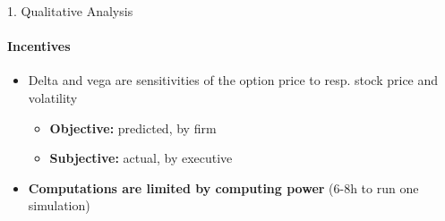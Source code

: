 \documentclass[compress]{beamer}
\begin{document}

\begin{frame}{1. Qualitative Analysis}
    \framesubtitle{Incentives}

    \begin{itemize}
        \item Delta and vega are sensitivities of the option price to resp. stock price and volatility 
        \begin{itemize}
            \item \textbf{Objective:} predicted, by firm
            \item \textbf{Subjective:} actual, by executive 
        \end{itemize}
        \item \textbf{Computations are limited by computing power} (6-8h to run one simulation)
    \end{itemize}
\end{frame}
\end{document}
